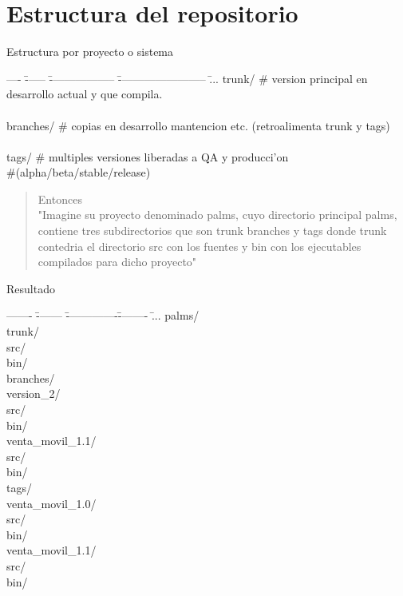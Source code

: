 \documentclass[xcolor=dvipsnames]{beamer}
\begin{document}
\section{Estructura del repositorio}
	\begin{frame}{Estructura por proyecto o sistema}
	\scriptsize
	{
	\begin{tabbing}
		---- \= ------ \= ------------------ \= ------------------------ \=  ... \kill
		\>trunk/	\>\> \# version \scriptsize{\color{Blue}principal} en desarrollo actual y que compila.\\ \\
		\>branches/	\>\> \# copias en desarrollo mantencion etc. (retroalimenta trunk y tags)\\ \\
		\>tags/		\>\> \# multiples versiones liberadas a QA y producci'on \\ 
		\>\>\>			 \#(alpha/beta/stable/release)\\
	\end{tabbing}
	}
	\begin{quote}{Entonces}
	{
		\\"Imagine su proyecto denominado palms, cuyo directorio principal palms,
		contiene tres subdirectorios que son trunk branches y tags donde trunk contedria
		el directorio src con los fuentes y bin con los ejecutables compilados para dicho proyecto"	\\
	}
	\end{quote}
	\end{frame}
	\begin{frame}{Resultado}
	\scriptsize
	{
	\begin{tabbing}
		------- \= ------- \= --------------\= -------- \=  ... \kill
		palms/											\\
		\>    trunk/									\\
		\>\>  		src/								\\
		\>\>  		bin/								\\
		\>    branches/									\\
		\>\>      version\_2/ 							\\
		\>\>\> src/ 									\\
		\>\>\> bin/ 									\\
		\>\>      venta\_movil\_1.1/ 					\\
		\>\>\>\> src/ 									\\
		\>\>\>\> bin/ 									\\
		\>    tags/										\\
		\>\>	  venta\_movil\_1.0/					\\
		\>\>\>\> src/ 									\\
		\>\>\>\> bin/ 									\\
		\>\>	  venta\_movil\_1.1/					\\
		\>\>\>\> src/ 									\\
		\>\>\>\> bin/ 									\\
	\end{tabbing}
	}
	\end{frame}
	
\end{document}
